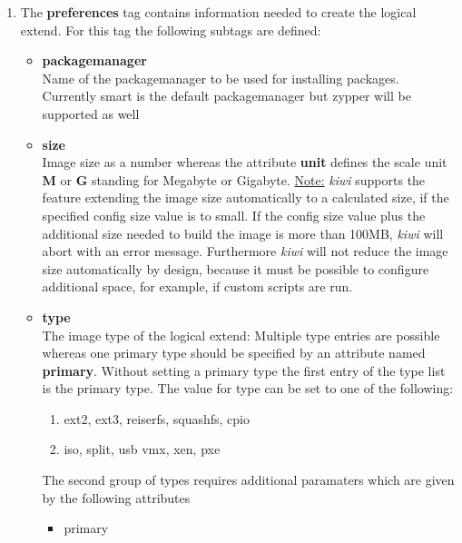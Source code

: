 \begin{itemize}
      \begin{enumerate}
          \item The \textbf{preferences} tag contains information needed to
          create the logical extend. For this tag the following subtags
          are defined:
          \begin{itemize}
              \item \textbf{packagemanager}\\
                    Name of the packagemanager to be used for installing
                    packages. Currently smart is the default packagemanager
                    but zypper will be supported as well
              \item \textbf{size}\\
                    Image size as a number whereas the attribute
                    \textbf{unit} defines the scale unit \textbf{M} or
                    \textbf{G} standing for Megabyte or Gigabyte.
                    \underline{Note:}
                    \textit{kiwi} supports the feature extending the image size
                    automatically to a calculated size, if the specified
                    config size value is to small. If the config size value
                    plus the additional size needed to build the image is more
                    than 100MB, \textit{kiwi} will abort with an error message.
                    Furthermore \textit{kiwi} will not reduce the image size
                    automatically by design, because it must be possible to
                    configure additional space, for example, if custom scripts
                    are run.
              \item \textbf{type}\\
                    The image type of the logical extend: Multiple type entries
					are possible whereas one primary type should be specified by
					an attribute named \textbf{primary}. Without setting a
					primary type the first entry of the type list is the primary
					type. The value for type can be set to one of the following:
					\begin{enumerate}
						\item ext2, ext3, reiserfs, squashfs, cpio
						\item iso, split, usb vmx, xen, pxe
					\end{enumerate}
					The second group of types requires additional paramaters
					which are given by the following attributes
					\begin{itemize}
						\item primary\\

\end{itemize}
\end{itemize}
\end{enumerate}
\end{itemize}
